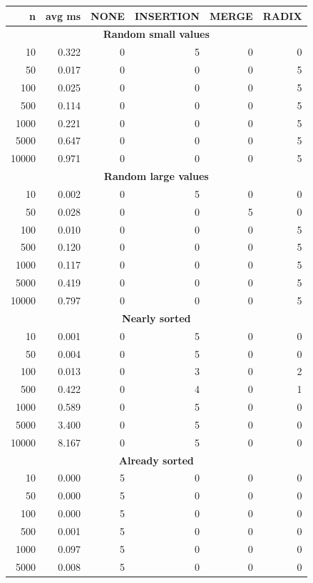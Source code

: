 \documentclass{article}
\begin{document}
\begin{table}[H]
\centering
\renewcommand{\arraystretch}{1.15}
\begin{tabular}{|r|r|r|r|r|r|}
\hline
\textbf{n} & \textbf{avg ms} & \textbf{NONE} & \textbf{INSERTION} & \textbf{MERGE} & \textbf{RADIX} \\
\hline
\multicolumn{6}{|c|}{\textbf{Random small values}} \\
\hline
10 & 0.322 & 0 & 5 & 0 & 0 \\
50 & 0.017 & 0 & 0 & 0 & 5 \\
100 & 0.025 & 0 & 0 & 0 & 5 \\
500 & 0.114 & 0 & 0 & 0 & 5 \\
1000 & 0.221 & 0 & 0 & 0 & 5 \\
5000 & 0.647 & 0 & 0 & 0 & 5 \\
10000 & 0.971 & 0 & 0 & 0 & 5 \\
\hline
\multicolumn{6}{|c|}{\textbf{Random large values}} \\
\hline
10 & 0.002 & 0 & 5 & 0 & 0 \\
50 & 0.028 & 0 & 0 & 5 & 0 \\
100 & 0.010 & 0 & 0 & 0 & 5 \\
500 & 0.120 & 0 & 0 & 0 & 5 \\
1000 & 0.117 & 0 & 0 & 0 & 5 \\
5000 & 0.419 & 0 & 0 & 0 & 5 \\
10000 & 0.797 & 0 & 0 & 0 & 5 \\
\hline
\multicolumn{6}{|c|}{\textbf{Nearly sorted}} \\
\hline
10 & 0.001 & 0 & 5 & 0 & 0 \\
50 & 0.004 & 0 & 5 & 0 & 0 \\
100 & 0.013 & 0 & 3 & 0 & 2 \\
500 & 0.422 & 0 & 4 & 0 & 1 \\
1000 & 0.589 & 0 & 5 & 0 & 0 \\
5000 & 3.400 & 0 & 5 & 0 & 0 \\
10000 & 8.167 & 0 & 5 & 0 & 0 \\
\hline
\multicolumn{6}{|c|}{\textbf{Already sorted}} \\
\hline
10 & 0.000 & 5 & 0 & 0 & 0 \\
50 & 0.000 & 5 & 0 & 0 & 0 \\
100 & 0.000 & 5 & 0 & 0 & 0 \\
500 & 0.001 & 5 & 0 & 0 & 0 \\
1000 & 0.097 & 5 & 0 & 0 & 0 \\
5000 & 0.008 & 5 & 0 & 0 & 0 \\

\end{tabular}
\end{table}
\end{document}
